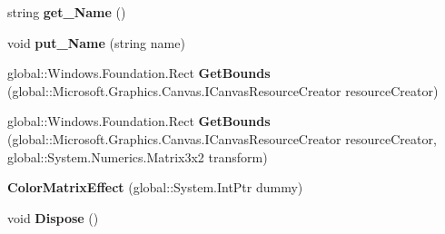 \begin{DoxyCompactItemize}
\item 
\mbox{\label{class_microsoft_1_1_graphics_1_1_canvas_1_1_effects_1_1_color_matrix_effect_aedf9c5d8b501943240da1bdfbe0248ad}} 
string {\bfseries get\+\_\+\+Name} ()
\item 
\mbox{\label{class_microsoft_1_1_graphics_1_1_canvas_1_1_effects_1_1_color_matrix_effect_a4495cce690024c06964968eaabe98f69}} 
void {\bfseries put\+\_\+\+Name} (string name)
\item 
\mbox{\label{class_microsoft_1_1_graphics_1_1_canvas_1_1_effects_1_1_color_matrix_effect_a68840abf9d46043f10ca1f360b2ddcba}} 
global\+::\+Windows.\+Foundation.\+Rect {\bfseries Get\+Bounds} (global\+::\+Microsoft.\+Graphics.\+Canvas.\+I\+Canvas\+Resource\+Creator resource\+Creator)
\item 
\mbox{\label{class_microsoft_1_1_graphics_1_1_canvas_1_1_effects_1_1_color_matrix_effect_a0e2f82cd686772845a245ad6d4195b00}} 
global\+::\+Windows.\+Foundation.\+Rect {\bfseries Get\+Bounds} (global\+::\+Microsoft.\+Graphics.\+Canvas.\+I\+Canvas\+Resource\+Creator resource\+Creator, global\+::\+System.\+Numerics.\+Matrix3x2 transform)
\item 
\mbox{\label{class_microsoft_1_1_graphics_1_1_canvas_1_1_effects_1_1_color_matrix_effect_a0961cd0876bc2b7499a3e547f7418c29}} 
{\bfseries Color\+Matrix\+Effect} (global\+::\+System.\+Int\+Ptr dummy)
\item 
\mbox{\label{class_microsoft_1_1_graphics_1_1_canvas_1_1_effects_1_1_color_matrix_effect_ae0856b4a12befe77832ff39a67427820}} 
void {\bfseries Dispose} ()
\item 
\mbox{\label{class_microsoft_1_1_graphics_1_1_canvas_1_1_effects_1_1_color_matrix_effect_a74b7638815e4e2ee11e421a48b5a1a54}} 

\end{DoxyCompactItemize}
